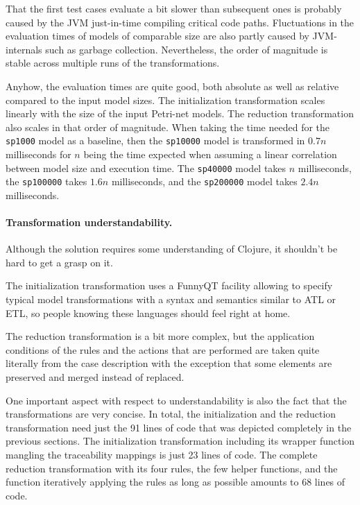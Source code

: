 \documentclass[11pt]{article}
\begin{document}
That the first test cases evaluate a bit slower than subsequent ones is
probably caused by the JVM just-in-time compiling critical code paths.
Fluctuations in the evaluation times of models of comparable size are also
partly caused by JVM-internals such as garbage collection.  Nevertheless, the
order of magnitude is stable across multiple runs of the transformations.

Anyhow, the evaluation times are quite good, both absolute as well as relative
compared to the input model sizes.  The initialization transformation scales
linearly with the size of the input Petri-net models.  The reduction
transformation also scales in that order of magnitude.  When taking the time
needed for the \verb|sp1000| model as a baseline, then the \verb|sp10000| model
is transformed in $0.7n$ milliseconds for $n$ being the time expected when
assuming a linear correlation between model size and execution time.  The
\verb|sp40000| model takes $n$ milliseconds, the \verb|sp100000| takes $1.6n$
milliseconds, and the \verb|sp200000| model takes $2.4n$ milliseconds.

\paragraph{Transformation understandability.}

Although the solution requires some understanding of Clojure, it shouldn't be
hard to get a grasp on it.

The initialization transformation uses a FunnyQT facility allowing to specify
typical model transformations with a syntax and semantics similar to ATL or
ETL, so people knowing these languages should feel right at home.

The reduction transformation is a bit more complex, but the application
conditions of the rules and the actions that are performed are taken quite
literally from the case description with the exception that some elements are
preserved and merged instead of replaced.

One important aspect with respect to understandability is also the fact that
the transformations are very concise.  In total, the initialization and the
reduction transformation need just the 91 lines of code that was depicted
completely in the previous sections.  The initialization transformation
including its wrapper function mangling the traceability mappings is just 23
lines of code.  The complete reduction transformation with its four rules, the
few helper functions, and the function iteratively applying the rules as long
as possible amounts to 68 lines of code.
\end{document}
